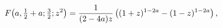 \[\mathop{F\/}\nolimits\!\left(a,\tfrac{1}{2}+a;\tfrac{3}{2};z^{2}\right)=\frac{%
1}{(2-4a)z}\left((1+z)^{1-2a}-(1-z)^{1-2a}\right),\]